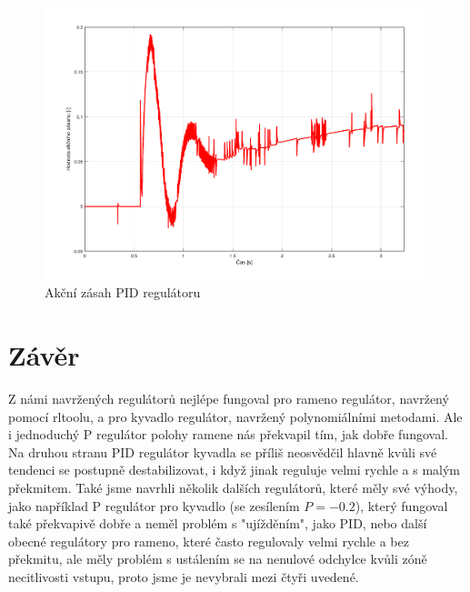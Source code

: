 \documentclass[a4paper,12pt]{article}
\begin{document}
\begin{figure}[H]
	\centering
    \includegraphics[scale=0.55]{odezva_kyvadlo_PID_akcnizasah}
    \caption{Akční zásah PID regulátoru}
\end{figure}

\section{Závěr}
Z námi navržených regulátorů nejlépe fungoval pro rameno regulátor, navržený pomocí rltoolu, a pro kyvadlo regulátor, navržený polynomiálními metodami. Ale i jednoduchý P regulátor polohy ramene nás překvapil tím, jak dobře fungoval. Na druhou stranu PID regulátor kyvadla se příliš neosvědčil hlavně kvůli své tendenci se postupně destabilizovat, i když jinak reguluje velmi rychle a s malým překmitem. Také jsme navrhli několik dalších regulátorů, které měly své výhody, jako například P regulátor pro kyvadlo (se zesílením $P=-0.2$), který fungoval také překvapivě dobře a neměl problém s "ujížděním", jako PID, nebo další obecné regulátory pro rameno, které často regulovaly velmi rychle a bez překmitu, ale měly problém s ustálením se na nenulové odchylce kvůli zóně necitlivosti vstupu, proto jsme je nevybrali mezi čtyři uvedené.
\newline
\end{document}
